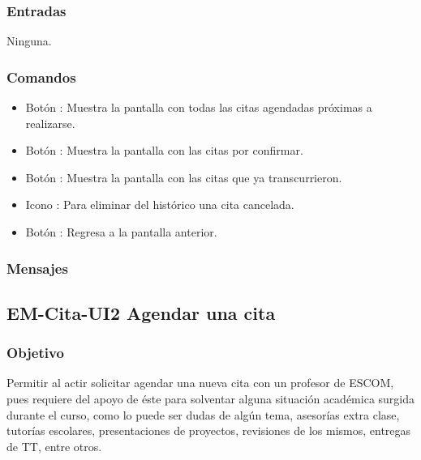 \subsubsection{Entradas}
	\noindent
	Ninguna.

\subsubsection{Comandos}
	\begin{itemize}
		\item Botón : Muestra la pantalla con todas las citas agendadas próximas a realizarse.
		\item Botón : Muestra la pantalla con las citas por confirmar.
		\item Botón : Muestra la pantalla con las citas que ya transcurrieron.
		\item Icono : Para eliminar del histórico una cita cancelada.
		\item Botón : Regresa a la pantalla anterior.
	\end{itemize}

\subsubsection{Mensajes}
	\begin{Citemize}
		\item {}
	\end{Citemize}


\pagebreak
\subsection{EM-Cita-UI2 Agendar una cita }

\subsubsection{Objetivo}
	\noindent
	Permitir al actir solicitar agendar una nueva cita con un profesor de ESCOM, pues requiere del apoyo de éste para solventar alguna situación académica surgida durante el curso, como lo puede ser dudas de algún tema, asesorías extra clase, tutorías escolares, presentaciones de proyectos, revisiones de los mismos, entregas de TT, entre otros.

